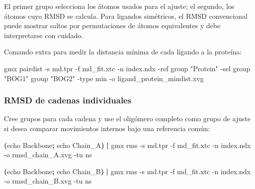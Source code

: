 \documentclass[
  spanish,
  11pt,
  a4paper]{article}
\newenvironment{Shaded}{\begin{snugshade}}{\end{snugshade}}
\newcommand{\AttributeTok}[1]{\textcolor[rgb]{0.13,0.29,0.53}{#1}}
\newcommand{\BuiltInTok}[1]{#1}
\newcommand{\ExtensionTok}[1]{#1}
\newcommand{\KeywordTok}[1]{\textcolor[rgb]{0.13,0.29,0.53}{\textbf{#1}}}
\newcommand{\NormalTok}[1]{#1}
\newcommand{\StringTok}[1]{\textcolor[rgb]{0.31,0.60,0.02}{#1}}
\begin{document}
El primer grupo selecciona los átomos usados para el ajuste; el segundo,
los átomos cuyo RMSD se calcula. Para ligandos simétricos, el RMSD
convencional puede mostrar saltos por permutaciones de átomos
equivalentes y debe interpretarse con cuidado.

Comando extra para medir la distancia mínima de cada ligando a la
proteína:

\begin{Shaded}
\begin{Highlighting}[]
\ExtensionTok{gmx}\NormalTok{ pairdist     }\AttributeTok{{-}s}\NormalTok{ md.tpr     }\AttributeTok{{-}f}\NormalTok{ md\_fit.xtc     }\AttributeTok{{-}n}\NormalTok{ index.ndx     }\AttributeTok{{-}ref} \StringTok{\textquotesingle{}group "Protein"\textquotesingle{}}     \AttributeTok{{-}sel} \StringTok{\textquotesingle{}group "BOG1"\textquotesingle{}} \StringTok{\textquotesingle{}group "BOG2"\textquotesingle{}}     \AttributeTok{{-}type}\NormalTok{ min     }\AttributeTok{{-}o}\NormalTok{ ligand\_protein\_mindist.xvg}
\end{Highlighting}
\end{Shaded}

\subsubsection{RMSD de cadenas
individuales}\label{rmsd-de-cadenas-individuales}

Cree grupos para cada cadena y use el oligómero completo como grupo de
ajuste si desea comparar movimientos internos bajo una referencia común:

\begin{Shaded}
\begin{Highlighting}[]
\KeywordTok{(}\BuiltInTok{echo}\NormalTok{ Backbone}\KeywordTok{;} \BuiltInTok{echo}\NormalTok{ Chain\_A}\KeywordTok{)} \KeywordTok{|}
\ExtensionTok{gmx}\NormalTok{ rms     }\AttributeTok{{-}s}\NormalTok{ md.tpr     }\AttributeTok{{-}f}\NormalTok{ md\_fit.xtc     }\AttributeTok{{-}n}\NormalTok{ index.ndx     }\AttributeTok{{-}o}\NormalTok{ rmsd\_chain\_A.xvg     }\AttributeTok{{-}tu}\NormalTok{ ns}

\KeywordTok{(}\BuiltInTok{echo}\NormalTok{ Backbone}\KeywordTok{;} \BuiltInTok{echo}\NormalTok{ Chain\_B}\KeywordTok{)} \KeywordTok{|}
\ExtensionTok{gmx}\NormalTok{ rms     }\AttributeTok{{-}s}\NormalTok{ md.tpr     }\AttributeTok{{-}f}\NormalTok{ md\_fit.xtc     }\AttributeTok{{-}n}\NormalTok{ index.ndx     }\AttributeTok{{-}o}\NormalTok{ rmsd\_chain\_B.xvg     }\AttributeTok{{-}tu}\NormalTok{ ns}
\end{Highlighting}
\end{Shaded}
\end{document}
